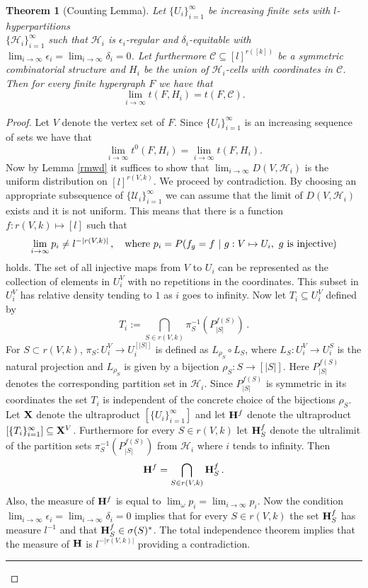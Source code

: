 \documentclass [11pt] {article}
\newcommand{\qed} {\hspace {0.1in} \rule {1.5mm} {3.5mm}}
\newtheorem{theorem}{Theorem}
\def\bH{{\bf H}}
\def\to{\rightarrow}
\def\xo{{\bf X}}
\begin{document}
\begin{theorem}[Counting Lemma]\label{counting} Let $\{U_i\}_{i=1}^\infty$ be
  increasing finite sets with $l$-hyperpartitions \\
$\{\mathcal{H}_i\}_{i=1}^\infty$ such that $\mathcal{H}_i$ is 
$\epsilon_i$-regular and $\delta_i$-equitable with 
$\lim_{i\to\infty}\epsilon_i=\lim_{i\to\infty}\delta_i=0$. 
Let furthermore  $\mathcal{C}\subseteq[l]^{r([k])}$ be a 
symmetric combinatorial structure and $H_i$ be the union 
of $\mathcal{H}_i$-cells with coordinates in $\mathcal{C}$.
Then for every finite hypergraph $F$ we have that
$$\lim_{i\to\infty}t(F,H_i)=t(F,\mathcal{C}).$$
\end{theorem}

\begin{proof}
Let $V$ denote the vertex set of $F$. 
Since $\{U_i\}_{i=1}^\infty$ is an increasing sequence of sets
we have that
$$\lim_{i\to\infty}t^0(F,H_i)=\lim_{i\to\infty}t(F,H_i).$$
Now by Lemma \ref{rmwd} it suffices to show that
$\lim_{i\to\infty}D(V,\mathcal{H}_i)$ is the uniform 
distribution on $[l]^{r(V,k)}$.
We proceed by contradiction. By choosing an appropriate 
subsequence of $\{\mathcal{U}_i\}_{i=1}^{\infty}$ we 
can assume that the limit of $D(V,\mathcal{H}_i)$ exists and 
it is not uniform. This means that there is a 
function $f:r(V,k)\mapsto [l]$ such that
$$\lim_{i\to\infty}p_i\neq l^{-|r(V,k)|}\,,\quad\mbox{where}\,\,
p_i=P(f_g=f~|~g:V\mapsto U_i,~g~{\rm is~injective})$$
holds.
The set of all injective maps from $V$ to $U_i$ can be
 represented as the collection of elements in $U_i^V$ with 
no repetitions in the coordinates. This subset in $U_i^V$ has
 relative density tending to $1$ as $i$ goes to infinity.
Now let $T_i\subseteq U_i^V$ defined by
$$T_i:=\bigcap_{S\in r(V,k)}\pi^{-1}_S(P_{|S|}^{f(S)})\,.$$
For $S\subset r(V,k)$, $\pi_S:U_i^V\to U_i^{[|S|]}$ is defined as
$L_{\rho_S}\circ L_S$, where $L_S:U_i^V\to U_i^S$ is the natural 
projection and $L_{\rho_S}$ is given by a bijection $\rho_S:S\to[|S|]$.
Here $P_{|S|}^{f(S)}$ denotes the corresponding
partition set in $\mathcal{H}_i$. Since $P_{|S|}^{f(S)}$ is symmetric in its
coordinates
 the set $T_i$ is independent of the concrete choice of the 
bijections $\rho_S$.
Let $\xo$ denote the ultraproduct $[\{U_i\}_{i=1}^\infty]$ and let $\bH^f$ 
denote the ultraproduct $[\{T_i\}_{i=1}^\infty]\subseteq\xo^V$.
Furthermore for every $S\in r(V,k)$ let $\bH^f_S$ denote the ultralimit
 of the partition sets $\pi^{-1}_S(P_{|S|}^{f(S)})$ from $\mathcal{H}_i$
 where $i$ tends to infinity.
Then
$$\bH^f=\bigcap_{S\in r(V,k)}\bH^f_S\,.$$
Also, the measure of $\bH^f$ is equal to 
$\lim_\omega p_i=\lim_{i\to\infty}p_i$.
Now the condition $\lim_{i\to\infty}\epsilon_i=\lim_{i\to\infty}\delta_i=0$
implies that for every $S\in r(V,k)$ the set $\bH^f_S$ has 
measure $l^{-1}$ and that $\bH^f_S\in\sigma(S)^*$.
The total independence theorem implies that the
 measure of $\bH$ is $l^{-|r(V,k)|}$ providing a contradiction.\qed
\end{proof}
\end{document}
